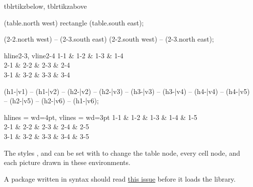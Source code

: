 \begin{codedescribe}[
        env,
        new=2025A
    ]{tblrtikzbelow, tblrtikzabove}
    \begin{codestore}[st=lib:tikz:nodes]
        \begin{tblrtikzbelow}
            \path[pattern=dots, pattern color=blue,
                draw=blue, thick, rounded corners]
            (table.north west) rectangle (table.south east);
        \end{tblrtikzbelow}%
        \begin{tblrtikzabove}
            (2-2.north west) -- (2-3.south east)
            (2-2.south west) -- (2-3.north east);
        \end{tblrtikzabove}%
        \begin{tblr}{hline{2-3}, vline{2-4}}
            1-1 & 1-2 & 1-3 & 1-4 \\
            2-1 & 2-2 & 2-3 & 2-4 \\
            3-1 & 3-2 & 3-3 & 3-4
        \end{tblr}\end{codestore}
    \begin{center}
    \end{center}

    \begin{codestore}[st=lib:tikz:corners]
        \begin{tblrtikzabove}
            (h1-|v1) -- (h1-|v2) -- (h2-|v2)
            -- (h2-|v3) -- (h3-|v3) -- (h3-|v4)
            -- (h4-|v4) -- (h4-|v5) -- (h2-|v5)
            -- (h2-|v6) -- (h1-|v6);
        \end{tblrtikzabove}%
        \begin{tblr}{hlines = {wd=4pt}, vlines = {wd=3pt}}
            1-1 & 1-2 & 1-3 & 1-4 & 1-5 \\
            2-1 & 2-2 & 2-3 & 2-4 & 2-5 \\
            3-1 & 3-2 & 3-3 & 3-4 & 3-5
        \end{tblr}\end{codestore}
    \begin{center}
    \end{center}
    \begin{tsremark}
        The styles ,  and  can be set with  to change the table node, every cell node, and each picture drawn in these environments.
    \end{tsremark}
    \begin{tsremark}
        A package written in  syntax should read \href{https://github.com/pgf-tikz/pgf/issues/1213}{this  issue} before it loads the library.
    \end{tsremark}
\end{codedescribe}

